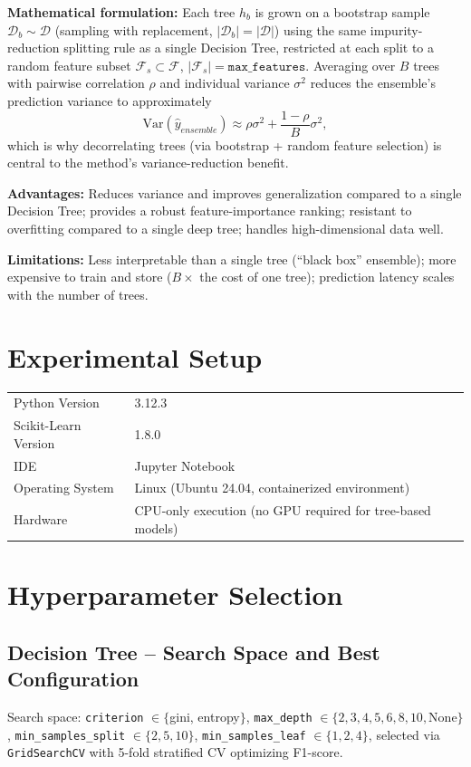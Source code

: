 \documentclass[12pt,a4paper]{article}
\begin{document}
\textbf{Mathematical formulation:} Each tree $h_b$ is grown on a bootstrap sample
$\mathcal{D}_b \sim \mathcal{D}$ (sampling with replacement, $|\mathcal{D}_b| = |\mathcal{D}|$)
using the same impurity-reduction splitting rule as a single Decision Tree, restricted at each
split to a random feature subset $\mathcal{F}_s \subset \mathcal{F}$, $|\mathcal{F}_s| =
\texttt{max\_features}$. Averaging over $B$ trees with pairwise correlation $\rho$ and individual
variance $\sigma^2$ reduces the ensemble's prediction variance to approximately
\[ \text{Var}(\hat{y}_{ensemble}) \approx \rho \sigma^2 + \frac{1-\rho}{B}\sigma^2, \]
which is why decorrelating trees (via bootstrap + random feature selection) is central to the
method's variance-reduction benefit.

\textbf{Advantages:} Reduces variance and improves generalization compared to a single Decision
Tree; provides a robust feature-importance ranking; resistant to overfitting compared to a single
deep tree; handles high-dimensional data well.

\textbf{Limitations:} Less interpretable than a single tree (``black box'' ensemble); more
expensive to train and store ($B\times$ the cost of one tree); prediction latency scales with the
number of trees.

\section{Experimental Setup}
\begin{tabular}{ll}
\toprule
Python Version & 3.12.3 \\
Scikit-Learn Version & 1.8.0 \\
IDE & Jupyter Notebook \\
Operating System & Linux (Ubuntu 24.04, containerized environment) \\
Hardware & CPU-only execution (no GPU required for tree-based models) \\
\bottomrule
\end{tabular}

\section{Hyperparameter Selection}

\subsection*{Decision Tree -- Search Space and Best Configuration}
Search space: \texttt{criterion} $\in \{$gini, entropy$\}$, \texttt{max\_depth} $\in \{2,3,4,5,6,8,10,$None$\}$,
\texttt{min\_samples\_split} $\in \{2,5,10\}$, \texttt{min\_samples\_leaf} $\in \{1,2,4\}$,
selected via \texttt{GridSearchCV} with 5-fold stratified CV optimizing F1-score.
\end{document}
